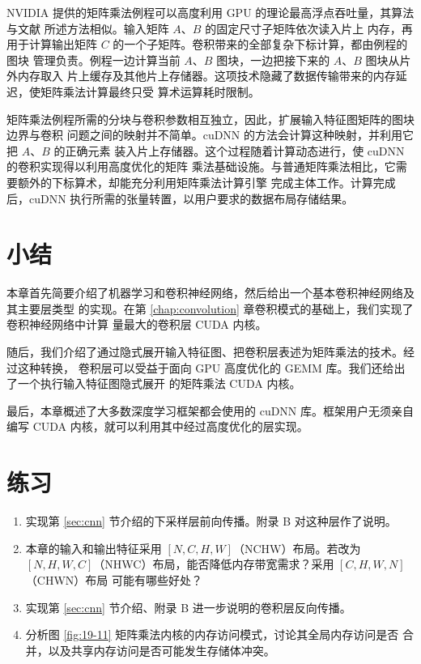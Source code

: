 NVIDIA 提供的矩阵乘法例程可以高度利用 GPU 的理论最高浮点吞吐量，其算法与文献
\cite{ch19-tan2011dgemm} 所述方法相似。输入矩阵 $A$、$B$ 的固定尺寸子矩阵依次读入片上
内存，再用于计算输出矩阵 $C$ 的一个子矩阵。卷积带来的全部复杂下标计算，都由例程的图块
管理负责。例程一边计算当前 $A$、$B$ 图块，一边把接下来的 $A$、$B$ 图块从片外内存取入
片上缓存及其他片上存储器。这项技术隐藏了数据传输带来的内存延迟，使矩阵乘法计算最终只受
算术运算耗时限制。

矩阵乘法例程所需的分块与卷积参数相互独立，因此，扩展输入特征图矩阵的图块边界与卷积
问题之间的映射并不简单。cuDNN 的方法会计算这种映射，并利用它把 $A$、$B$ 的正确元素
装入片上存储器。这个过程随着计算动态进行，使 cuDNN 的卷积实现得以利用高度优化的矩阵
乘法基础设施。与普通矩阵乘法相比，它需要额外的下标算术，却能充分利用矩阵乘法计算引擎
完成主体工作。计算完成后，cuDNN 执行所需的张量转置，以用户要求的数据布局存储结果。

\section{小结}
\label{sec:cnn-summary}

本章首先简要介绍了机器学习和卷积神经网络，然后给出一个基本卷积神经网络及其主要层类型
的实现。在第 \ref{chap:convolution} 章卷积模式的基础上，我们实现了卷积神经网络中计算
量最大的卷积层 CUDA 内核。

随后，我们介绍了通过隐式展开输入特征图、把卷积层表述为矩阵乘法的技术。经过这种转换，
卷积层可以受益于面向 GPU 高度优化的 GEMM 库。我们还给出了一个执行输入特征图隐式展开
的矩阵乘法 CUDA 内核。

最后，本章概述了大多数深度学习框架都会使用的 cuDNN 库。框架用户无须亲自编写 CUDA
内核，就可以利用其中经过高度优化的层实现。

\section{练习}
\label{sec:cnn-exercises}

\begin{enumerate}[label=\arabic*.,leftmargin=2.7em]
  \item 实现第 \ref{sec:cnn} 节介绍的下采样层前向传播。附录 B 对这种层作了说明。

  \item 本章的输入和输出特征采用 $[N,C,H,W]$（NCHW）布局。若改为
  $[N,H,W,C]$（NHWC）布局，能否降低内存带宽需求？采用 $[C,H,W,N]$（CHWN）布局
  可能有哪些好处？

  \item 实现第 \ref{sec:cnn} 节介绍、附录 B 进一步说明的卷积层反向传播。

  \item 分析图 \ref{fig:19-11} 矩阵乘法内核的内存访问模式，讨论其全局内存访问是否
  合并，以及共享内存访问是否可能发生存储体冲突。
\end{enumerate}

